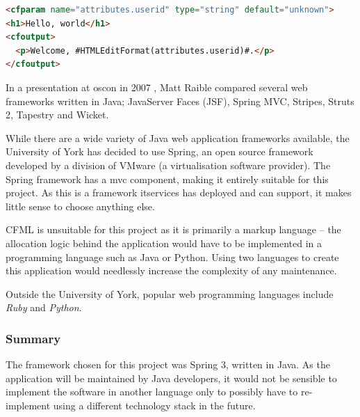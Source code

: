 \documentclass[twoside,draft]{scrartcl}
\begin{document}
\begin{lstlisting}[language=HTML]
<cfparam name="attributes.userid" type="string" default="unknown">
<h1>Hello, world</h1>
<cfoutput>
  <p>Welcome, #HTMLEditFormat(attributes.userid)#.</p>
</cfoutput>
\end{lstlisting}

In a presentation at \gls{oscon} in 2007 \cite{raible2007javawebframeworks},
Matt Raible compared several web frameworks written in Java; JavaServer Faces
(JSF), Spring MVC, Stripes, Struts 2, Tapestry and Wicket.

While there are a wide variety of Java web application frameworks available,
the University of York has decided to use Spring, an open source framework
developed by a division of VMware (a virtualisation software provider). The
Spring framework has a \gls{mvc} component, making it entirely suitable for
this project. As this is a framework \gls{itservices} has deployed and can
support, it makes little sense to choose anything else.

CFML is unsuitable for this project as it is primarily a markup language -- the
allocation logic behind the application would have to be implemented in a
programming language such as Java or Python. Using two languages to create
this application would needlessly increase the complexity of any maintenance.


Outside the University of York, popular web programming languages include
\emph{Ruby} and \emph{Python}.

% 
% 

\subsubsection{Summary}

The framework chosen for this project was Spring 3, written in Java. As the
application will be maintained by Java developers, it would not be sensible to
implement the software in another language only to possibly have to
re-implement using a different technology stack in the future.
\end{document}
